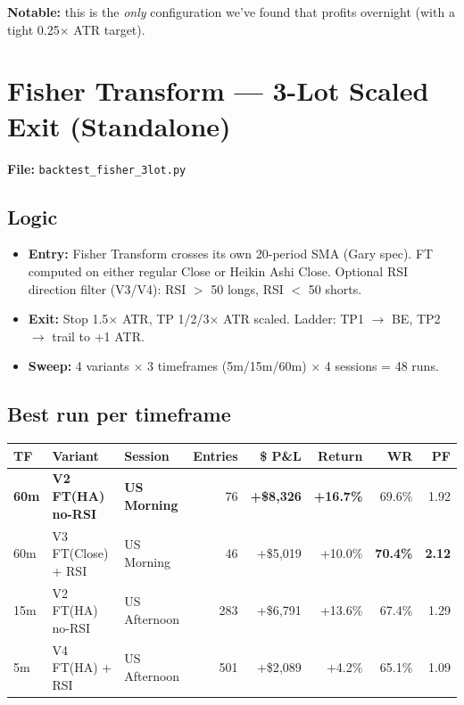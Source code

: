 \documentclass[11pt]{article}
\newcommand{\pos}[1]{\textcolor{posgreen}{\textbf{#1}}}
\begin{document}
\textbf{Notable:} this is the \emph{only} configuration we've found that profits overnight (with a tight 0.25$\times$ ATR target).

\newpage
\section{Fisher Transform --- 3-Lot Scaled Exit (Standalone)}

\textbf{File:} \texttt{backtest\_fisher\_3lot.py}

\subsection{Logic}
\begin{itemize}
\item \textbf{Entry:} Fisher Transform crosses its own 20-period SMA (Gary spec). FT computed on either regular Close or Heikin Ashi Close. Optional RSI direction filter (V3/V4): RSI $>$ 50 longs, RSI $<$ 50 shorts.
\item \textbf{Exit:} Stop 1.5$\times$ ATR, TP 1/2/3$\times$ ATR scaled. Ladder: TP1 $\rightarrow$ BE, TP2 $\rightarrow$ trail to +1 ATR.
\item \textbf{Sweep:} 4 variants $\times$ 3 timeframes (5m/15m/60m) $\times$ 4 sessions = 48 runs.
\end{itemize}

\subsection{Best run per timeframe}
\begin{table}[h!]
\centering
\small
\begin{tabular}{lllrrrrr}
\toprule
TF & Variant & Session & Entries & \$ P\&L & Return & WR & PF \\
\midrule
\pos{60m} & \pos{V2 FT(HA) no-RSI} & \pos{US Morning} & 76  & \pos{+\$8{,}326} & \pos{+16.7\%} & 69.6\% & 1.92 \\
60m       & V3 FT(Close) + RSI     & US Morning       & 46  & +\$5{,}019 & +10.0\% & \pos{70.4\%} & \pos{2.12} \\
15m       & V2 FT(HA) no-RSI       & US Afternoon     & 283 & +\$6{,}791 & +13.6\% & 67.4\% & 1.29 \\
5m        & V4 FT(HA) + RSI        & US Afternoon     & 501 & +\$2{,}089 & +4.2\%  & 65.1\% & 1.09 \\
\bottomrule
\end{tabular}
\end{table}
\end{document}
